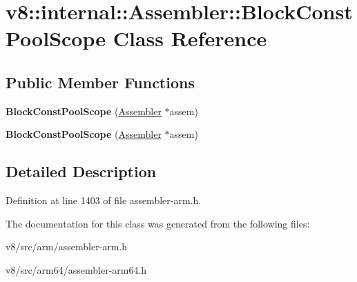 \hypertarget{classv8_1_1internal_1_1Assembler_1_1BlockConstPoolScope}{}\section{v8\+:\+:internal\+:\+:Assembler\+:\+:Block\+Const\+Pool\+Scope Class Reference}
\label{classv8_1_1internal_1_1Assembler_1_1BlockConstPoolScope}
\subsection*{Public Member Functions}
\begin{DoxyCompactItemize}
\item 
\mbox{\label{classv8_1_1internal_1_1Assembler_1_1BlockConstPoolScope_ac38a15fd24b4a70820c1fc63a9eb0640}} 
{\bfseries Block\+Const\+Pool\+Scope} (\mbox{\hyperlink{classv8_1_1internal_1_1Assembler}{Assembler}} $\ast$assem)
\item 
\mbox{\label{classv8_1_1internal_1_1Assembler_1_1BlockConstPoolScope_ac38a15fd24b4a70820c1fc63a9eb0640}} 
{\bfseries Block\+Const\+Pool\+Scope} (\mbox{\hyperlink{classv8_1_1internal_1_1Assembler}{Assembler}} $\ast$assem)
\end{DoxyCompactItemize}


\subsection{Detailed Description}


Definition at line 1403 of file assembler-\/arm.\+h.



The documentation for this class was generated from the following files\+:\begin{DoxyCompactItemize}
\item 
v8/src/arm/assembler-\/arm.\+h\item 
v8/src/arm64/assembler-\/arm64.\+h\end{DoxyCompactItemize}
